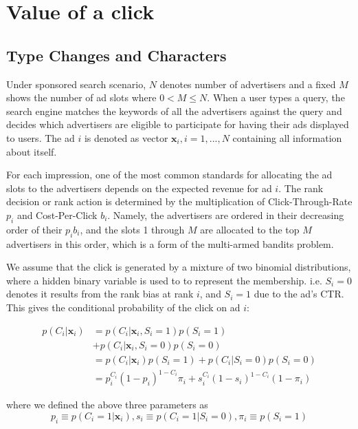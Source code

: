 \documentclass{acm_proc_article-sp}
\begin{document}
\section{Value of a click}
\subsection{Type Changes and  Characters}

Under sponsored search scenario, $N$ denotes number of advertisers and a fixed $M$ shows the number of ad slots where $0<M\leqslant N$. When a user types a query, the search engine matches the keywords of all the advertisers against the query and decides which advertisers are eligible to participate for having their ads displayed to users. The ad $i$ is denoted as vector $\mathbf{x}_{i},i=1,...,N$ containing all information about itself.

For each impression, one of the most common standards for allocating the ad slots to the advertisers depends on the expected revenue for ad $i$. The rank decision or rank action is determined by the multiplication of Click-Through-Rate $p_{i}$ and Cost-Per-Click $b_{i}$. Namely, the advertisers are ordered in their decreasing order of their $p_{i}b_{i}$, and the slots 1 through $M$ are allocated to the top $M$ advertisers in this order, which is a form of the multi-armed bandits problem.

We assume that the click is generated by a mixture of two binomial distributions, where a hidden binary variable is used to to represent the membership. i.e. $S_{i}=0$ denotes it results from the rank bias at rank $i$, and $S_{i}=1$ due to the ad's CTR. This gives the conditional probability of the click on ad $i$:

\begin{equation}
\begin{split}
p(C_{i}|\mathbf{x}_{i}) & =p(C_{i}|\mathbf{x}_{i},S_{i}=1)p(S_{i}=1) \\
 & +p(C_{i}|\mathbf{x}_{i},S_{i}=0)p(S_{i}=0) \\
 & =p(C_{i}|\mathbf{x}_{i})p(S_{i}=1)+p(C_{i}|S_{i}=0)p(S_{i}=0) \\
 & =p_{i}^{C_{i}}(1-p_{i})^{1-C_{i}}\pi_{i}+s_{i}^{C_{i}}(1-s_{i})^{1-C_{i}}(1-\pi_{i})
\end{split}
\end{equation}

where we defined the above three parameters as 
\begin{equation}
p_{i}\equiv p(C_{i}=1|\mathbf{x}_{i}), s_{i}\equiv p(C_{i}=1|S_{i}=0), \pi_{i}\equiv p(S_{i}=1)
\end{equation}
\end{document}
